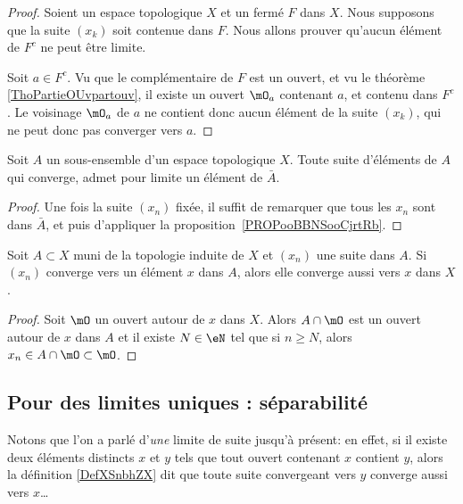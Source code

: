 \begin{proof}
    Soient un espace topologique \( X\) et un fermé \( F\) dans \( X\). Nous supposons que la suite \( (x_k)\) soit contenue dans \( F\). Nous allons prouver qu'aucun élément de \( F^c\) ne peut être limite.

    Soit \( a \in F^c\). Vu que le complémentaire de \( F\) est un ouvert, et vu le théorème \ref{ThoPartieOUvpartouv}, il existe un ouvert \( \mO_a\) contenant \( a\), et contenu dans \( F^c\). Le voisinage \( \mO_a\) de \( a\) ne contient donc aucun élément de la suite \( (x_k)\), qui ne peut donc pas converger vers \( a\).
\end{proof}

\begin{corollary}\label{CorLimAbarA}
  Soit \( A \) un sous-ensemble d'un espace topologique \(X \). Toute suite d'éléments de \(A \) qui converge, admet pour limite un élément de \( \bar A \).
\end{corollary}
\begin{proof}
  Une fois la suite \( (x_n) \) fixée, il suffit de remarquer que tous les \( x_n \) sont dans \( \bar A \), et puis d'appliquer la proposition~\ref{PROPooBBNSooCjrtRb}. 
\end{proof}


\begin{lemma}   \label{LemPESaiVw}
    Soit \( A\subset X\) muni de la topologie induite de \( X\) et \( (x_n)\) une suite dans \( A\). Si \( (x_n) \) converge vers un élément \( x \) dans \(A \), alors elle converge aussi vers \(x \) dans \( X \).
\end{lemma}

\begin{proof}
    Soit \( \mO\) un ouvert autour de \( x\) dans \( X\). Alors \( A\cap\mO\) est un ouvert autour de \( x\) dans \( A\) et il existe \( N\in \eN\) tel que si \( n\geq N\), alors \( x_n\in A\cap\mO\subset\mO\).
\end{proof}

\subsection{Pour des limites uniques : séparabilité}

Notons que l'on a parlé d'\emph{une} limite de suite jusqu'à présent: en effet, si il existe deux éléments distincts $x$ et $y$ tels que tout ouvert contenant $x$ contient $y$, alors la définition \ref{DefXSnbhZX} dit que toute suite convergeant vers $y$ converge aussi vers $x$\dots


